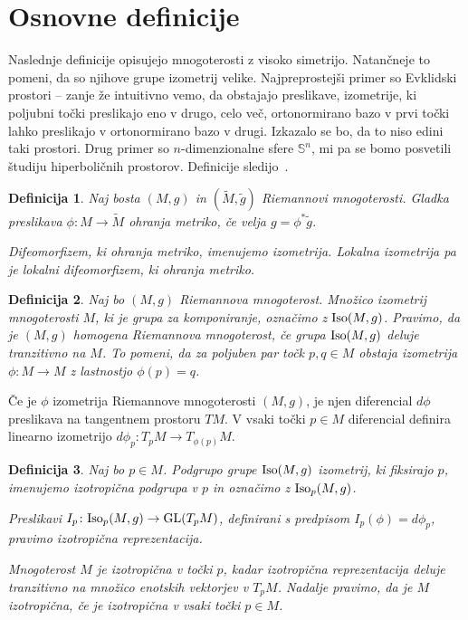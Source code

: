 \documentclass[a4paper]{article}
\newtheorem{definicija}{Definicija}
\begin{document}
\section{Osnovne definicije}

Naslednje definicije opisujejo mnogoterosti z visoko simetrijo. Natančneje to pomeni, da so njihove grupe izometrij velike. Najpreprostejši primer so Evklidski prostori -- zanje že intuitivno vemo, da obstajajo preslikave, izometrije, ki poljubni točki preslikajo eno v drugo, celo več, ortonormirano bazo v prvi točki lahko preslikajo v ortonormirano bazo v drugi. Izkazalo se bo, da to niso edini taki prostori. Drug primer so $n$-dimenzionalne sfere $\mathbb{S}^{n}$, mi pa se bomo posvetili študiju hiperboličnih prostorov. Definicije sledijo~\cite[3.~poglavje]{leeRM}.

\begin{definicija}
Naj bosta $(M,g)$ in $(\tilde{M}, \tilde{g})$ Riemannovi mnogoterosti. Gladka preslikava $\phi \colon M \to \tilde{M}$ \emph{ohranja metriko}, če velja $g = \phi^{*}\tilde{g}$.

Difeomorfizem, ki ohranja metriko, imenujemo \emph{izometrija}. \emph{Lokalna izometrija} pa je lokalni difeomorfizem, ki ohranja metriko. 
\end{definicija}

\begin{definicija}
Naj bo $(M,g)$ Riemannova mnogoterost. Množico izometrij mnogoterosti $M$, ki je grupa za komponiranje, označimo z $\textup{Iso}(M,g)$.
Pravimo, da je $(M,g)$ \emph{homogena Riemannova mnogoterost}, če grupa $\textup{Iso}(M,g)$ deluje tranzitivno na $M$. To pomeni, da za poljuben par točk $p,q \in M$ obstaja izometrija $\phi \colon M \to M$ z lastnostjo $\phi(p)=q$.
\end{definicija}

Če je $\phi$ izometrija Riemannove mnogoterosti $(M,g)$, je njen diferencial $d\phi$ preslikava na tangentnem prostoru $TM$. V vsaki točki $p \in M$ diferencial definira linearno izometrijo $d\phi_{p} \colon T_{p}M \to T_{\phi(p)}M$.

\begin{definicija}
Naj bo $p \in M$. Podgrupo grupe $\textup{Iso}(M,g)$ izometrij, ki fiksirajo $p$, imenujemo \emph{izotropična podgrupa} v $p$ in označimo z 
$\textup{Iso}_{p}(M,g)$. 

Preslikavi $I_{p} \colon \textup{Iso}_{p}(M,g) \to \textup{GL}(T_{p}M)$, definirani s predpisom $I_{p}(\phi) = d\phi_{p}$, pravimo \emph{izotropična reprezentacija}.

Mnogoterost $M$ je \emph{izotropična v točki $p$}, kadar izotropična reprezentacija deluje tranzitivno na množico enotskih vektorjev v $T_{p}M$. Nadalje pravimo, da je $M$ \emph{izotropična}, če je izotropična v vsaki točki $p \in M$.
\end{definicija}
\end{document}
